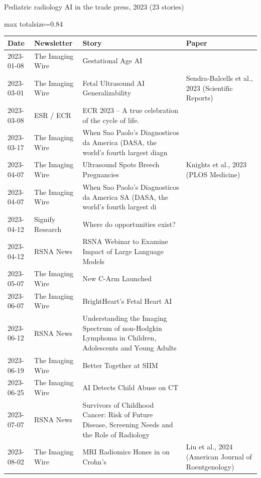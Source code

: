 \documentclass[aspectratio=169]{beamer}
\renewcommand{\arraystretch}{1.08}
\begin{document}
\begin{frame}[category=Newsletters]{Pediatric radiology AI in the trade press, 2023 (23 stories)}
\tiny
\begin{adjustbox}{max totalsize={\textwidth}{0.84\textheight}}
\renewcommand{\arraystretch}{1.2}
\begin{tabular}{|l|l|>{\raggedright\arraybackslash}p{}|>{\raggedright\arraybackslash}p{}|}
\hline \textbf{Date} & \textbf{Newsletter} & \textbf{Story} & \textbf{Paper} \\ \hline
2023-01-08 & The Imaging Wire & Gestational Age AI &  \\ \hline
2023-03-01 & The Imaging Wire & Fetal Ultrasound AI Generalizability & Sendra-Balcells et al., 2023 (Scientific Reports) \\ \hline
2023-03-08 & ESR / ECR & ECR 2023 -- A true celebration of the cycle of life. &  \\ \hline
2023-03-17 & The Imaging Wire & When Sao Paolo's Diagnosticos da America (DASA, the world's fourth largest diagn &  \\ \hline
2023-04-07 & The Imaging Wire & Ultrasound Spots Breech Pregnancies & Knights et al., 2023 (PLOS Medicine) \\ \hline
2023-04-07 & The Imaging Wire & When Sao Paolo's Diagnosticos da America SA (DASA, the world's fourth largest di &  \\ \hline
2023-04-12 & Signify Research & Where do opportunities exist? &  \\ \hline
2023-04-12 & RSNA News & RSNA Webinar to Examine Impact of Large Language Models &  \\ \hline
2023-05-07 & The Imaging Wire & New C-Arm Launched &  \\ \hline
2023-06-07 & The Imaging Wire & BrightHeart's Fetal Heart AI &  \\ \hline
2023-06-12 & RSNA News & Understanding the Imaging Spectrum of non-Hodgkin Lymphoma in Children, Adolescents and Young Adults &  \\ \hline
2023-06-19 & The Imaging Wire & Better Together at SIIM &  \\ \hline
2023-06-25 & The Imaging Wire & AI Detects Child Abuse on CT &  \\ \hline
2023-07-07 & RSNA News & Survivors of Childhood Cancer: Risk of Future Disease, Screening Needs and the Role of Radiology &  \\ \hline
2023-08-02 & The Imaging Wire & MRI Radiomics Hones in on Crohn's & Liu et al., 2024 (American Journal of Roentgenology) \\ \hline

\end{tabular}
\end{adjustbox}
\end{frame}
\end{document}
